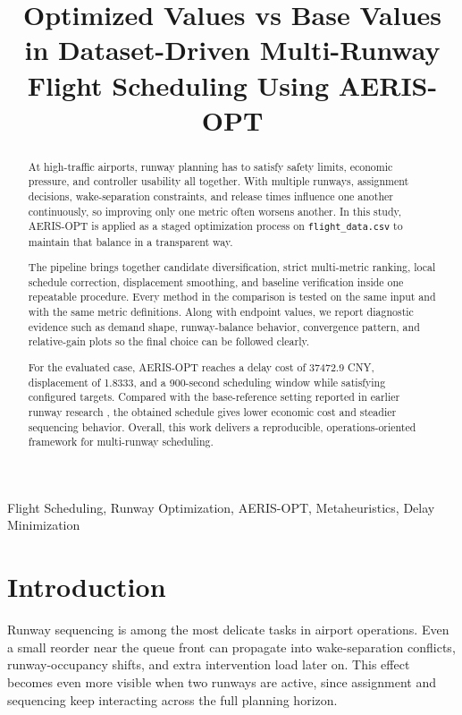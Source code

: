 \documentclass[conference]{IEEEtran}
\title{Optimized Values vs Base Values in Dataset-Driven Multi-Runway Flight Scheduling Using AERIS-OPT}
\author{%
\IEEEauthorblockN{Kommi Druthendra, G. Sai Santhosh, K. Dhanush, K. Jushal Reddy, Prdeepa M}
\IEEEauthorblockA{Integrated M.Tech Software Engineering, VIT Vellore}
}
\begin{document}
\maketitle

\begin{abstract}
At high-traffic airports, runway planning has to satisfy safety limits, economic pressure, and controller usability all together. With multiple runways, assignment decisions, wake-separation constraints, and release times influence one another continuously, so improving only one metric often worsens another. In this study, AERIS-OPT is applied as a staged optimization process on \texttt{flight\_data.csv} to maintain that balance in a transparent way.

The pipeline brings together candidate diversification, strict multi-metric ranking, local schedule correction, displacement smoothing, and baseline verification inside one repeatable procedure. Every method in the comparison is tested on the same input and with the same metric definitions. Along with endpoint values, we report diagnostic evidence such as demand shape, runway-balance behavior, convergence pattern, and relative-gain plots so the final choice can be followed clearly.

For the evaluated case, AERIS-OPT reaches a delay cost of 37472.9 CNY, displacement of 1.8333, and a 900-second scheduling window while satisfying configured targets. Compared with the base-reference setting reported in earlier runway research \cite{ref19}, the obtained schedule gives lower economic cost and steadier sequencing behavior. Overall, this work delivers a reproducible, operations-oriented framework for multi-runway scheduling.
\end{abstract}

\begin{IEEEkeywords}
Flight Scheduling, Runway Optimization, AERIS-OPT, Metaheuristics, Delay Minimization
\end{IEEEkeywords}

\section{Introduction}
Runway sequencing is among the most delicate tasks in airport operations. Even a small reorder near the queue front can propagate into wake-separation conflicts, runway-occupancy shifts, and extra intervention load later on. This effect becomes even more visible when two runways are active, since assignment and sequencing keep interacting across the full planning horizon.
\end{document}
